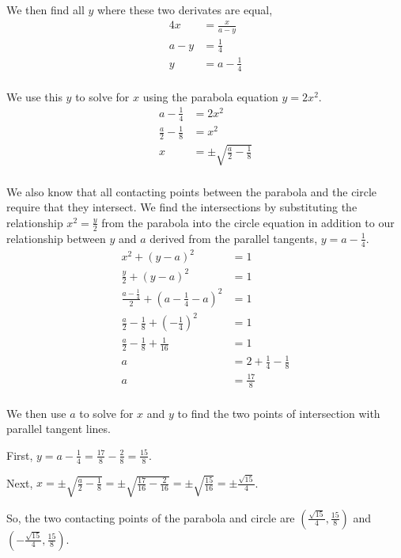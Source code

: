 \documentclass[../hw3.tex]{subfiles}
\begin{document}
We then find all $y$ where these two derivates are equal,
\begin{align*}
    4x &= \frac{x}{a-y} \\
    a-y &= \frac{1}{4} \\
    y &= a - \frac{1}{4} \\
\end{align*}

We use this $y$ to solve for $x$ using the parabola equation $y = 2x^2$.
\begin{align*}
    a - \frac{1}{4} &= 2x^2 \\
    \frac{a}{2} - \frac{1}{8} &= x^2 \\
    x &= \pm \sqrt{\frac{a}{2} - \frac{1}{8}} \\
\end{align*}

We also know that all contacting points between the parabola and the circle require that they intersect. We find the intersections by substituting the relationship $x^2 = \frac{y}{2}$ from the parabola into the circle equation in addition to our relationship between $y$ and $a$ derived from the parallel tangents, $y = a - \frac{1}{4}$.
\begin{align*}
    x^2 + {(y-a)}^2 &= 1 \\
    \frac{y}{2} + {(y-a)}^2 &= 1 \\
    \frac{a - \frac{1}{4}}{2} + {\left( a - \frac{1}{4} - a \right)}^2 &= 1 \\
    \frac{a}{2} - \frac{1}{8} + {\left( -\frac{1}{4} \right)}^2 &= 1 \\
    \frac{a}{2} - \frac{1}{8} + \frac{1}{16} &= 1 \\
    a &= 2 + \frac{1}{4} - \frac{1}{8} \\
    a &= \frac{17}{8} \\
\end{align*}

We then use $a$ to solve for $x$ and $y$ to find the two points of intersection with parallel tangent lines.

First, $y = a - \frac{1}{4} = \frac{17}{8} - \frac{2}{8} = \frac{15}{8}$.

Next, $x = \pm \sqrt{\frac{a}{2} - \frac{1}{8}} = \pm \sqrt{\frac{17}{16} - \frac{2}{16}} = \pm \sqrt{\frac{15}{16}} = \pm \frac{\sqrt{15}}{4}$.

So, the two contacting points of the parabola and circle are $\left( \frac{\sqrt{15}}{4}, \frac{15}{8} \right)$ and $\left( -\frac{\sqrt{15}}{4}, \frac{15}{8} \right)$.
\end{document}
